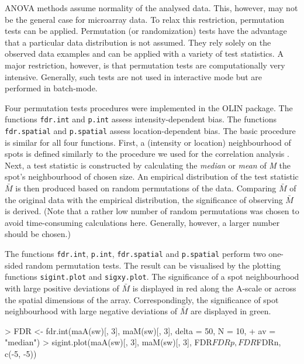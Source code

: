 \documentclass[a4paper,11pt]{article}
\begin{document}
ANOVA methods assume normality of the analysed data. This, however, may not be the
general case for microarray data. To relax this restriction, permutation tests can be
applied. Permutation (or randomization) tests have the advantage that a particular data 
distribution is not assumed. They rely solely on the observed data examples and can be 
applied with a variety of test statistics. A major restriction, however, is that 
permutation tests are computationally very intensive.
Generally, such tests are not used in interactive mode but are performed in batch-mode. 


Four permutation tests procedures were implemented in the OLIN package. 
The functions \texttt{fdr.int}  and \texttt{p.int} assess intensity-dependent
bias. The functions \texttt{fdr.spatial} and \texttt{p.spatial} assess location-dependent
bias. The basic procedure is similar for all four functions.
First, a (intensity or location)  neighbourhood of spots is defined similarly to the procedure
we used for the correlation analysis .  Next, a test statistic is constructed by calculating
 the \emph{median} or \emph{mean} of \emph{M} the  spot's  neighbourhood of chosen size.
 An empirical distribution of the test statistic $\bar{M}$ is 
then produced  based on random permutations of the
data. Comparing  $\bar{M}$ of the original data with the empirical distribution, the significance 
of observing  $\bar{M}$ is derived. (Note that a rather low number of random permutations was chosen
to avoid time-consuming calculations here. Generally, however, a larger number should be chosen.)  


The functions \texttt{fdr.int}, \texttt{p.int}, \texttt{fdr.spatial} and  \texttt{p.spatial}
perform two one-sided random permutation tests. The result can be visualised by 
the plotting functions \texttt{sigint.plot} and \texttt{sigxy.plot}. 
The significance of a spot neighbourhood with large positive deviations of $\bar{M}$ is 
displayed in red along the A-scale or across the spatial dimensions of the array. 
Correspondingly, the significance of spot neighbourhood with large negative 
deviations of  $\bar{M}$ are displayed in green.  


\begin{Schunk}
\begin{Sinput}
> FDR <- fdr.int(maA(sw)[, 3], maM(sw)[, 3], delta = 50, N = 10, 
+ av = "median")
> sigint.plot(maA(sw)[, 3], maM(sw)[, 3], FDR$FDRp, FDR$FDRn, c(-5, -5))
\end{Sinput}
\end{Schunk}
\end{document}
